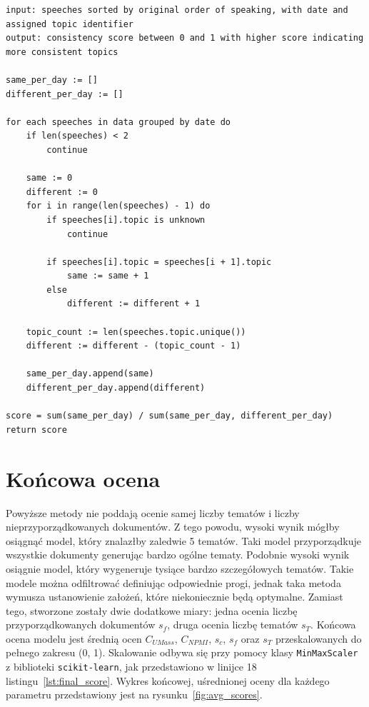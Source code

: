 	\begin{lstlisting}[style=algorithm,label=lst:consistency_alg,caption=Algorytm obliczania spójności tematów]
input: speeches sorted by original order of speaking, with date and assigned topic identifier
output: consistency score between 0 and 1 with higher score indicating more consistent topics
	
same_per_day := []
different_per_day := []

for each speeches in data grouped by date do
	if len(speeches) < 2
		continue
	
	same := 0
	different := 0
	for i in range(len(speeches) - 1) do
		if speeches[i].topic is unknown
			continue

		if speeches[i].topic = speeches[i + 1].topic
			same := same + 1
		else
			different := different + 1

	topic_count := len(speeches.topic.unique())
	different := different - (topic_count - 1)
	
	same_per_day.append(same)
	different_per_day.append(different)

score = sum(same_per_day) / sum(same_per_day, different_per_day)
return score
	\end{lstlisting}

\section{Końcowa ocena}
	Powyższe metody nie poddają ocenie samej liczby tematów i liczby nieprzyporządkowanych dokumentów.
	Z tego powodu, wysoki wynik mógłby osiągnąć model, który znalazłby zaledwie 5 tematów.
	Taki model przyporządkuje wszystkie dokumenty generując bardzo ogólne tematy.
	Podobnie wysoki wynik osiągnie model, który wygeneruje tysiące bardzo szczegółowych tematów.
	Takie modele można odfiltrować definiując odpowiednie progi, jednak taka metoda wymusza ustanowienie założeń,
		które niekoniecznie będą optymalne.
	Zamiast tego, stworzone zostały dwie dodatkowe miary: jedna ocenia liczbę przyporządkowanych dokumentów \(s_f\), druga ocenia liczbę tematów \(s_T\).
	Końcowa ocena modelu jest średnią ocen \(C_{UMass}\), \(C_{NPMI}\), \(s_c\), \(s_f\) oraz \(s_T\) przeskalowanych do pełnego zakresu (0, 1).
	Skalowanie odbywa się przy pomocy klasy \verb|MinMaxScaler| z biblioteki \verb|scikit-learn|,
		jak przedstawiono w linijce 18 listingu~\ref{lst:final_score}.
	Wykres końcowej, uśrednionej oceny dla każdego parametru przedstawiony jest na rysunku~\ref{fig:avg_scores}.


